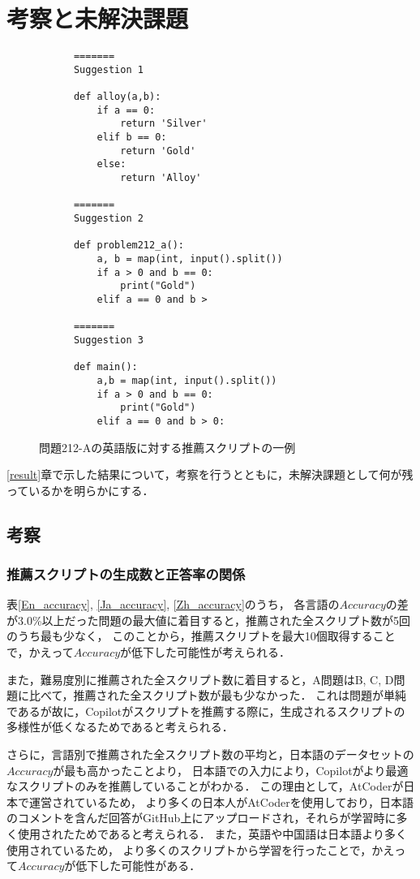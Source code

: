 \section{考察と未解決課題\label{discussion}}
  \begin{figure}[t]
    \begin{verbatim}
      =======
      Suggestion 1

      def alloy(a,b):
          if a == 0:
              return 'Silver'
          elif b == 0:
              return 'Gold'
          else:
              return 'Alloy'

      =======
      Suggestion 2

      def problem212_a():
          a, b = map(int, input().split())
          if a > 0 and b == 0:
              print("Gold")
          elif a == 0 and b >

      =======
      Suggestion 3

      def main():
          a,b = map(int, input().split())
          if a > 0 and b == 0:
              print("Gold")
          elif a == 0 and b > 0:
    \end{verbatim}
    \caption{問題212-Aの英語版に対する推薦スクリプトの一例}
    \label{recommend_212_A_en}
  \end{figure}
  \ref{result}章で示した結果について，考察を行うとともに，未解決課題として何が残っているかを明らかにする．
  \vspace{-1zh}
  \subsection{考察\label{consideration}}
  \subsubsection{推薦スクリプトの生成数と正答率の関係}
  表\ref{En_accuracy}, \ref{Ja_accuracy}, \ref{Zh_accuracy}のうち，
  各言語の$Accuracy$の差が3.0\%以上だった問題の最大値に着目すると，推薦された全スクリプト数が5回のうち最も少なく，
  このことから，推薦スクリプトを最大10個取得することで，かえって$Accuracy$が低下した可能性が考えられる．

  また，難易度別に推薦された全スクリプト数に着目すると，A問題はB, C, D問題に比べて，推薦された全スクリプト数が最も少なかった．
  これは問題が単純であるが故に，Copilotがスクリプトを推薦する際に，生成されるスクリプトの多様性が低くなるためであると考えられる．

  さらに，言語別で推薦された全スクリプト数の平均と，日本語のデータセットの$Accuracy$が最も高かったことより，
  日本語での入力により，Copilotがより最適なスクリプトのみを推薦していることがわかる．
  この理由として，AtCoder\cite{AtCoder}が日本で運営されているため，
  より多くの日本人がAtCoderを使用しており，日本語のコメントを含んだ回答がGitHub上にアップロードされ，それらが学習時に多く使用されたためであると考えられる．
  また，英語や中国語は日本語より多く使用されているため，
  より多くのスクリプトから学習を行ったことで，かえって$Accuracy$が低下した可能性がある．    
